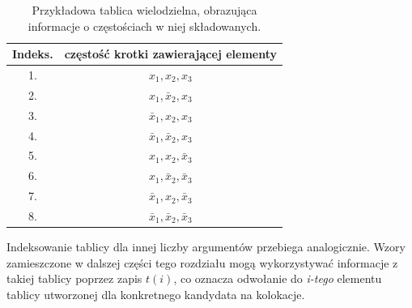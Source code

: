 \begin{table}[h!]
\centering
\begin{tabular}{c | c}
	\toprule
	Indeks.	& częstość krotki zawierającej elementy									\\
	\midrule
	1. 		& \( x_{1}, 		x_{2}, 			x_{3} \)		\\
	2. 		& \( x_{1}, 		\bar{x}_{2}, 	x_{3} \)		\\
	3. 		& \( \bar{x}_{1}, 	x_{2}, 			x_{3} \)		\\
	4. 		& \( \bar{x}_{1}, 	\bar{x}_{2}, 	x_{3} \)		\\
	5. 		& \( x_{1}, 		x_{2}, 			\bar{x}_{3} \)	\\
	6. 		& \( x_{1}, 		\bar{x}_{2}, 	\bar{x}_{3} \)	\\
	7. 		& \( \bar{x}_{1}, 	x_{2}, 			\bar{x}_{3} \)	\\
	8. 		& \( \bar{x}_{1}, 	\bar{x}_{2}, 	\bar{x}_{3} \)	\\
	\bottomrule
\end{tabular}
\caption[Tablica wielodzielna dla krotki trójelementowej]{Przykładowa tablica wielodzielna, obrazująca informacje o częstościach w niej składowanych.}
\label{observed_contingency_table}
\end{table}

Indeksowanie tablicy dla innej liczby argumentów przebiega analogicznie.
Wzory zamieszczone w dalszej części tego rozdziału mogą wykorzystywać informacje z takiej tablicy poprzez zapis $ t(i) $, co oznacza odwołanie do \emph{i-tego} elementu tablicy utworzonej dla konkretnego kandydata na kolokacje.

